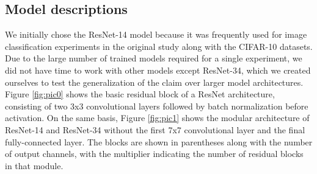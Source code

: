 \subsection{Model descriptions}
We initially chose the ResNet-14 model because it was frequently used for image classification experiments in the original study along with the CIFAR-10 datasets. Due to the large number of trained models required for a single experiment, we did not have time to work with other models except ResNet-34, which we created ourselves to test the generalization of the claim over larger model architectures. Figure \ref{fig:pic0} shows the basic residual block of a ResNet architecture, consisting of two 3x3 convolutional layers followed by batch normalization before activation. On the same basis, Figure \ref{fig:pic1} shows the modular architecture of ResNet-14 and ResNet-34 \cite{he2016deep} without the first 7x7 convolutional layer and the final fully-connected layer. The blocks are shown in parentheses along with the number of output channels, with the multiplier indicating the number of residual blocks in that module. 
